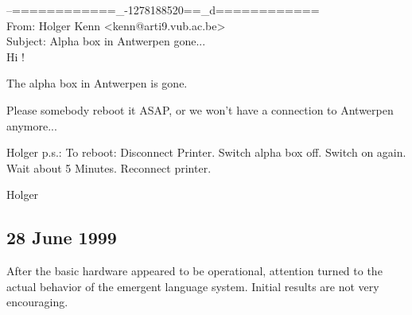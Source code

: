 \begin{mail}
--============\_-1278188520==\_d============\\
From: Holger Kenn <kenn@arti9.vub.ac.be>\\
Subject: Alpha box in Antwerpen gone...\\

Hi !

The alpha box in Antwerpen is gone.

Please somebody reboot it ASAP, or we won't have a connection to
Antwerpen anymore...

Holger
p.s.: 
To reboot: 
	Disconnect Printer.
	Switch alpha box off.
	Switch on again.
	Wait about 5 Minutes.
	Reconnect printer.

Holger
\end{mail}

\subsection*{28 June 1999} 

After the basic hardware appeared to be operational, attention turned to the actual behavior of the 
emergent language system. Initial results are not very encouraging. 

